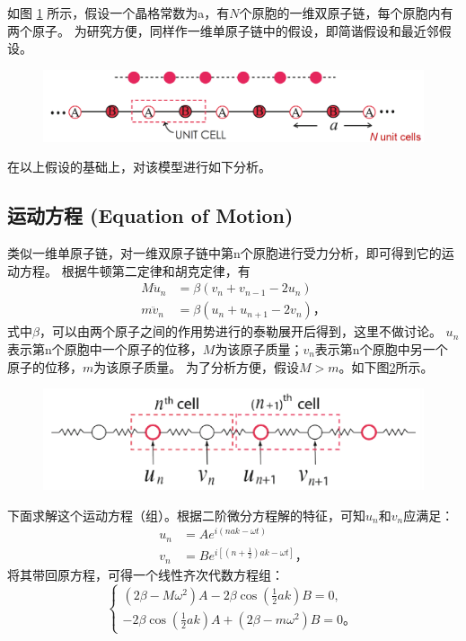 \documentclass[declarePage]{ecnuthesis}
\begin{document}
如图 \ref{1DDC} 所示，假设一个晶格常数为a，有$N$个原胞的一维双原子链，每个原胞内有两个原子。
为研究方便，同样作一维单原子链中的假设，即简谐假设和最近邻假设。
\begin{figure}[htb]
    \centering
    \includegraphics[width=.7\textwidth]{1DDC.png}
    \label{1DDC}
\end{figure}

在以上假设的基础上，对该模型进行如下分析。

\subsection{运动方程 (Equation of Motion)}

类似一维单原子链，对一维双原子链中第n个原胞进行受力分析，即可得到它的运动方程。%
根据牛顿第二定律和胡克定律，有
\begin{align}
    M \ddot{u}_n &= \beta (v_n + v_{n-1} - 2u_n)\\
    m \ddot{v}_n &= \beta (u_n + u_{n+1} - 2v_n) \text{，}
\end{align}
式中$\beta$，可以由两个原子之间的作用势进行的泰勒展开后得到，这里不做讨论。%
$u_n$表示第n个原胞中一个原子的位移，$M$为该原子质量；$v_n$表示第n个原胞中另一个原子的位移，$m$为该原子质量。%
为了分析方便，假设$M>m$。如下图\ref{1DDCEOF}所示。
\begin{figure}[htb]
    \centering
    \includegraphics[width=.7\textwidth]{1DDCEOF.png}
    \label{1DDCEOF}
\end{figure}

下面求解这个运动方程（组）。根据二阶微分方程解的特征，可知$u_n$和$v_n$应满足：
\begin{align}
    u_n &= A e^{i(nak - \omega t)}\\
    v_n &= B e^{i[(n + \frac{1}{2}) ak - \omega t]} \text{，} \label{1DDCEOM}
\end{align}
将其带回原方程，可得一个线性齐次代数方程组：
\begin{equation}
    \begin{cases}
        (2 \beta - M \omega ^2)A-2 \beta \cos (\frac{1}{2}ak)B = 0,\\
        -2\beta\cos (\frac{1}{2}ak)A + (2\beta - m \omega ^2)B = 0 \text{。}
    \end{cases}
\end{equation}
\end{document}
